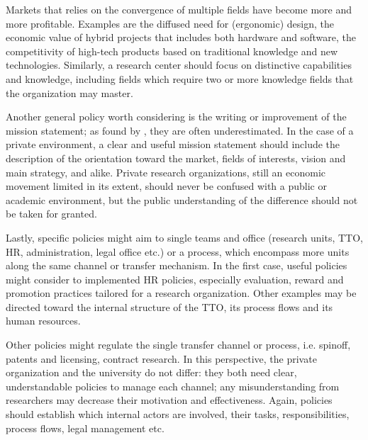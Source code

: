 Markets that relies on the convergence of multiple fields have become more and more profitable. Examples are the diffused need for (ergonomic) design, the economic value of hybrid projects that includes both hardware and software, the competitivity of high-tech products based on traditional knowledge and new technologies. Similarly, a research center should focus on distinctive capabilities and knowledge, including fields which require two or more knowledge fields that the organization may master. 
 
Another general policy worth considering is the writing or improvement of the mission statement; as found by \citet{Fitzgerald2015}, they are often underestimated. In the case of a private environment, a clear and useful mission statement should include the description of the orientation toward the market, fields of interests, vision and main strategy, and alike. Private research organizations, still an economic movement limited in its extent, should never be confused with a public or academic environment, but the public understanding of the difference should not be taken for granted. 

Lastly, specific policies might aim to single teams and office (research units, TTO, HR, administration, legal office etc.) or a process, which encompass more units along the same channel or transfer mechanism. In the first case, useful policies might consider to implemented HR policies, especially evaluation, reward and promotion practices tailored for a research organization. Other examples may be directed toward the internal structure of the TTO, its process flows and its human resources.

Other policies might regulate the single transfer channel or process, i.e. spinoff, patents and licensing, contract research. In this perspective, the private organization and the university do not differ: they both need clear, understandable policies to manage each channel; any misunderstanding from researchers may decrease their motivation and effectiveness. Again, policies should establish which internal actors are involved, their tasks, responsibilities, process flows, legal management etc.
